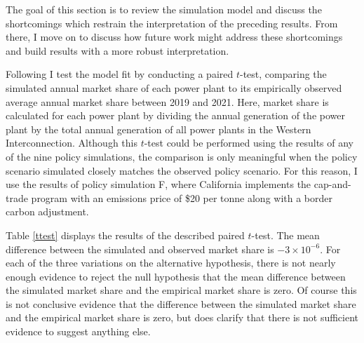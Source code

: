 The goal of this section is to review the simulation model and discuss the shortcomings which restrain the interpretation of the preceding results. From there, I move on to discuss how future work might address these shortcomings and build results with a more robust interpretation. 

Following \cite{weber2021dynamic} I test the model fit by conducting a paired $t$-test, comparing the simulated annual market share of each power plant to its empirically observed average annual market share between 2019 and 2021. Here, market share is calculated for each power plant by dividing the annual generation of the power plant by the total annual generation of all power plants in the Western Interconnection. Although this $t$-test could be performed using the results of any of the nine policy simulations, the comparison is only meaningful when the policy scenario simulated closely matches the observed policy scenario. For this reason, I use the results of policy simulation F, where California implements the cap-and-trade program with an emissions price of \$20 per tonne along with a border carbon adjustment. 

Table \ref{ttest} displays the results of the described paired $t$-test. The mean difference between the simulated and observed market share is $-3 \times 10^{-6}$. For each of the three variations on the alternative hypothesis, there is not nearly enough evidence to reject the null hypothesis that the mean difference between the simulated market share and the empirical market share is zero. Of course this is not conclusive evidence that the difference between the simulated market share and the empirical market share is zero, but does clarify that there is not sufficient evidence to suggest anything else.

